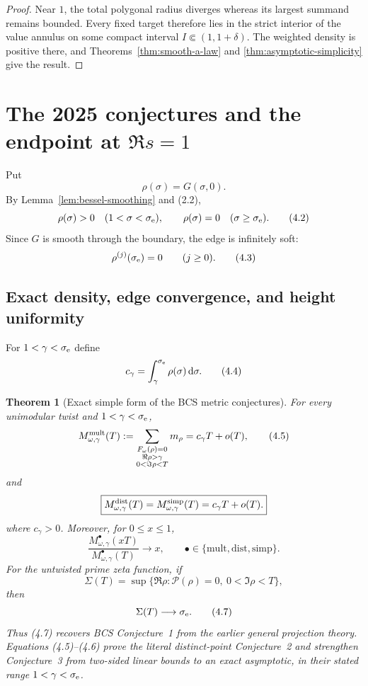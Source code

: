 \documentclass[11pt]{article}
\newtheorem{theorem}{Theorem}[section]
\theoremstyle{definition}
\theoremstyle{remark}
\newcommand{\cP}{\mathcal P}
\newcommand{\dd}{\,\mathrm d}
\begin{document}
\begin{proof}
Near $1$, the total polygonal radius diverges whereas its largest summand remains
bounded.  Every fixed target therefore lies in the strict interior of the value
annulus on some compact interval $I\Subset(1,1+\delta)$.  The weighted density is
positive there, and Theorems~\ref{thm:smooth-a-law} and
\ref{thm:asymptotic-simplicity} give the result.
\end{proof}

\section{The 2025 conjectures and the endpoint at \texorpdfstring{$\Re s=1$}{Re s=1}}
\label{sec:bcs-endpoint}

Put
\[
 \rho(\sigma)=G(\sigma,0).
\tag{4.1}
\]
By Lemma~\ref{lem:bessel-smoothing} and (2.2),
\[
 \rho(\sigma)>0\quad(1<\sigma<\sigma_{\rm e}),
 \qquad
 \rho(\sigma)=0\quad(\sigma\ge\sigma_{\rm e}).
\tag{4.2}
\]
Since $G$ is smooth through the boundary, the edge is infinitely soft:
\[
 \rho^{(j)}(\sigma_{\rm e})=0\qquad(j\ge0).
\tag{4.3}
\]

\subsection{Exact density, edge convergence, and height uniformity}

For $1<\gamma<\sigma_{\rm e}$ define
\[
 c_\gamma=\int_\gamma^{\sigma_{\rm e}}\rho(\sigma)\dd\sigma.
\tag{4.4}
\]

\begin{theorem}[Exact simple form of the BCS metric conjectures]
\label{thm:bcs}
For every unimodular twist and $1<\gamma<\sigma_{\rm e}$,
\[
 M^{\rm mult}_{\omega,\gamma}(T):=
 \sum_{\substack{F_\omega(\rho)=0\\
                  \Re\rho>\gamma\\0<\Im\rho<T}}m_\rho
 =c_\gamma T+o(T),
\tag{4.5}
\]
and
\[
 \boxed{
 M^{\rm dist}_{\omega,\gamma}(T)
 =M^{\rm simp}_{\omega,\gamma}(T)
 =c_\gamma T+o(T).
 }
\]
where $c_\gamma>0$.  Moreover, for $0\le x\le1$,
\[
 \frac{M^{\bullet}_{\omega,\gamma}(xT)}
      {M^{\bullet}_{\omega,\gamma}(T)}\longrightarrow x,
 \qquad \bullet\in\{\mathrm{mult},\mathrm{dist},\mathrm{simp}\}.
\tag{4.6}
\]
For the untwisted prime zeta function, if
\[
 \Sigma(T)=\sup\{\Re\rho:\cP(\rho)=0,\ 0<\Im\rho<T\},
\]
then
\[
 \Sigma(T)\longrightarrow\sigma_{\rm e}.
\tag{4.7}
\]
Thus (4.7) recovers BCS Conjecture~1 from the earlier general projection theory.
Equations (4.5)--(4.6) prove the literal distinct-point Conjecture~2 and strengthen
Conjecture~3 from two-sided linear bounds to an exact asymptotic, in their stated range
$1<\gamma<\sigma_{\rm e}$.
\end{theorem}
\end{document}

